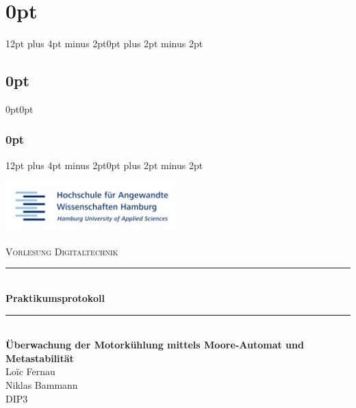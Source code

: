 
\lhead{}
\rhead{}



\usepackage{titlesec}
\titlespacing\section{0pt}{12pt plus 4pt minus 2pt}{0pt plus 2pt minus 2pt}
\titlespacing\subsection{0pt}{0pt}{0pt}
\titlespacing\subsubsection{0pt}{12pt plus 4pt minus 2pt}{0pt plus 2pt minus 2pt}



	

 	\begin{titlepage}
 		\begin{flushright}
			\includegraphics[width=0.5\textwidth]{img/title.png}\\[2cm]
		\end{flushright}
		
		\begin{center}
			\textsc{\Large Vorlesung Digitaltechnik}
			\rule{\linewidth}{0.5mm}\\[1.5cm]
			{ \huge \bfseries Praktikumsprotokoll}
			\rule{\linewidth}{0.5mm}\\[2cm]
			{ \huge \bfseries Überwachung der Motorkühlung mittels Moore-Automat und Metastabilität}\\[2cm]

			\LARGE Loïc Fernau \\
			\LARGE Niklas Bammann \\[4cm]
			\large DIP3
		\end{center}
	\end{titlepage}
	\newpage
	
	\renewcommand{\baselinestretch}{0.8}\normalsize
	\tableofcontents
	\listoffigures
	\listoftables
	\renewcommand{\baselinestretch}{1.0}\normalsize
	
	\newpage

	\setlength{\headsep}{0.4em}
	

	
	
	
	
	


	\newpage



